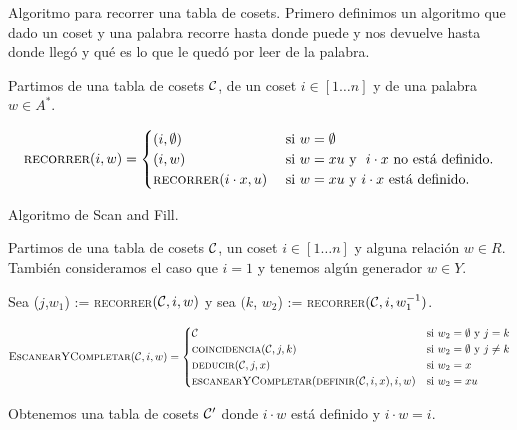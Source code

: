 \documentclass[aspectratio=169, 9pt]{beamer}
\newcommand{\coin}{\textsc{coincidencia}}
\newcommand{\edeff}{\textsc{estáDefinido}}
\newcommand{\definir}{\textsc{definir}}
\newcommand{\scanfill}{\textsc{escanearYCompletar}}
\newcommand{\ded}{\textsc{deducir}}
\newcommand{\recorrer}{\textsc{recorrer}}
\newcommand{\In}{[1 \dots n]}
\newcommand{\Co}{{\cal{C}}}
\begin{document}
\begin{frame}[fragile]{Algoritmo para recorrer una tabla de cosets.}
	Primero definimos un algoritmo que dado un coset y una palabra recorre hasta donde puede y nos devuelve hasta donde llegó y qué es lo que le quedó por leer de la palabra.
	
	\pause
	Partimos de una tabla de cosets $\Co$, de un coset $i \in \In$ y de una palabra $w \in A^*$.
		
	\begin{equation*}
		\textsc{recorrer}(i,w) = 
		\begin{cases}
			(i, \emptyset) \ \ &\text{si} \ w = \emptyset \\
			(i, w) \  &\text{si} \ w = xu \  \text{y} \ \ i \cdot x \ \text{no está definido.} \\
			\textsc{recorrer}(i \cdot x, u) \ &\text{si} \ w = xu \ \text{y} \  i \cdot x  \text{ está definido.} \\
		\end{cases}
	\end{equation*}

	
	
	
	
	
\end{frame}

\begin{frame}[fragile]{Algoritmo de Scan and Fill.}
	
		Partimos de una tabla de cosets $\Co$, un coset $i \in \In$ y alguna relación $w \in R$. 
		También consideramos el caso que  $i = 1$ y tenemos algún generador $w \in Y$.
		\pause
		
		{Sea} ($j$,$w_1$) := \recorrer$(\Co, i, w)$ y sea $({k}$, $w_2$) :=  \recorrer$(\Co,i, w_1^{-1})$.
		
		\pause
		\begin{equation*}
			\textsc{EscanearYCompletar}(\Co, i , w) = 
			\begin{cases}
				\Co \ &\text{si} \  w_2 = \emptyset \ \text{y} \ j=k  \\
				\coin({\Co, j,k}) & \text{si} \  w_2 = \emptyset \ \text{y} \ j \neq k   \\
				\ded(\Co, j, x) & \text{si} \ w_2 = x   \\
				\scanfill(\definir(\Co,i,x),i,w) & \text{si} \ w_2 = xu
			\end{cases}
		\end{equation*}
		
		\pause
		Obtenemos una tabla de cosets $\Co'$ donde $i \cdot w$ está definido y $i \cdot w = i$.
\end{frame}
\end{document}
